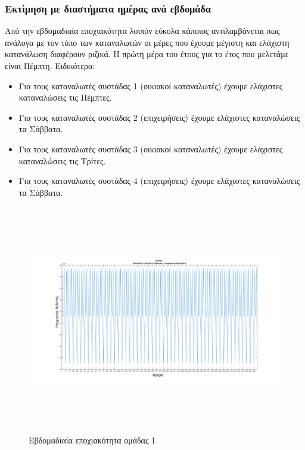 \subsubsection{Εκτίμηση με διαστήματα ημέρας ανά εβδομάδα}
Από την εβδομαδιαία εποχιακότητα λοιπόν εύκολα κάποιος αντιλαμβάνεται πως ανάλογα με τον τύπο των καταναλωτών οι μέρες που έχουμε μέγιστη και ελάχιστη κατανάλωση διαφέρουν ριζικά. Η πρώτη μέρα του έτους για το έτος που μελετάμε είναι Πέμπτη. Ειδικότερα:
\begin{itemize}
\item Για τους καταναλωτές συστάδας 1 (οικιακοί καταναλωτές) έχουμε ελάχιστες καταναλώσεις τις Πέμπτες.
\item Για τους καταναλωτές συστάδας 2 (επιχειρήσεις) έχουμε ελάχιστες καταναλώσεις τα Σάββατα.
\item Για τους καταναλωτές συστάδας 3 (οικιακοί καταναλωτές) έχουμε ελάχιστες καταναλώσεις τις Τρίτες.
\item Για τους καταναλωτές συστάδας 4 (επιχειρήσεις) έχουμε ελάχιστες καταναλώσεις τα Σάββατα.
\end{itemize}
\newpage
\begin{figure}[ht!]
\centering
\includegraphics[width=180mm, height=100mm]{../../plots/Trend_estimation/seasonal_1.png}
\caption{Εβδομαδιαία εποχιακότητα ομάδας 1}
\label{fig:season 1}
\end{figure}
